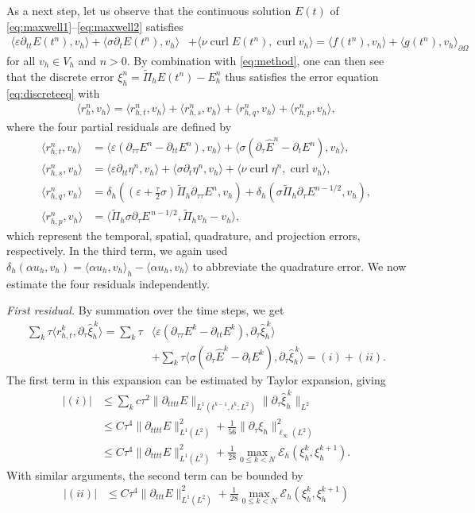 \documentclass[12pt,reqno,a4paper]{amsart}
\theoremstyle{definition}
\def\EE{\mathscr{E}}
\def\dtautau{\partial_{\tau\tau}}
\def\dtau{\partial_{\tau}}
\def\dt{\partial_{t}}
\def\dtt{\partial_{tt}}
\def\dttt{\partial_{ttt}}
\def\dtttt{\partial_{tttt}}
\def\curl{\operatorname{curl}}
\def\wPi{\widetilde\Pi}
\def\E{{E}}
\def\r{{r}}
\def\wt{\widetilde}
\def\wh{\widehat}
\def\eps{\varepsilon}
\def\la{\langle}
\def\ra{\rangle}
\begin{document}
As a next step, let us observe that the continuous solution $E(t)$ of \eqref{eq:maxwell1}--\eqref{eq:maxwell2} satisfies
\begin{align*}
\la\varepsilon \dtt\E(t^n),v_h\ra + \la\sigma\dt\E(t^n), v_h\ra &+ \la\nu\curl\E(t^n),\curl v_h\ra
= \la f(t^n),v_h\ra + \la g(t^n),v_h\ra_{\partial\Omega}
\end{align*}
for all $v_h\in V_h$ and $n>0$.
By combination with \eqref{eq:method}, one can then see that the discrete error $\xi_h^n = \wt\Pi_h E(t^n) - E_h^n$ thus satisfies the error equation \eqref{eq:discreteeq} with 
\begin{align*}
\la\r_h^n,v_h\ra = \la\r_{h,t}^n,v_h\ra + \la \r_{h,s}^n,v_h\ra + \la\r_{h,q}^n,v_h\ra + \la\r_{h,p}^n,v_h\ra,
\end{align*}
where the four partial residuals are defined by 
\begin{align*}
\la\r_{h,t}^n,v_h\ra &= \la\varepsilon(\dtautau E^n -\dtt E^n),v_h\ra + \la\sigma(\dtau \wh E^n-\dt E^n),v_h\ra, \\
\la\r_{h,s}^n,v_h\ra &= \la\varepsilon\dtt\eta^n,v_h\ra + \la\sigma\dt\eta^n,v_h\ra+ \la\nu\curl\eta^n,\curl v_h\ra, \\
\la\r_{h,q}^n,v_h\ra &= \delta_h((\eps+\tfrac\tau2\sigma) \wPi_h \dtautau E^n, v_h) + 
\delta_h(\sigma \wPi_h \dtau E^{n-1/2}, v_h), \\
\la\r_{h,p}^n,v_h\ra &= \la\wPi_h \sigma \dtau E^{\,n-1/2},\wPi_h v_h- v_h\ra,
\end{align*}
which represent the temporal, spatial, quadrature, and projection errors, respectively.
In the third term, we again used $\delta_h(\alpha u_h,v_h) = \la\alpha u_h,v_h\ra_h - \la\alpha u_h,v_h\ra$ to abbreviate the quadrature error.
We now estimate the four residuals independently.

\medskip 
\noindent 
\textit{First residual.}
By summation over the time steps, we get
\begin{align*}
\sum\nolimits_k \tau\la\r_{h,t}^k,\dtau\wh\xi_h^{\,k}\ra
= \sum\nolimits_k  \tau&\la\varepsilon(\dtautau E^k -\dtt E^k),\dtau\wh\xi_h^{\,k}\ra \\
&+ \sum\nolimits_k \tau\la\sigma(\dtau \wh E^k-\dt E^k),\dtau\wh\xi_h^{\,k}\ra
=(i) + (ii).
\end{align*}
The first term in this expansion can be estimated by Taylor expansion, giving
\begin{align*}
|(i)| &\le \sum\nolimits_k c \tau^2 \|\dtttt E\|_{L^1(t^{k-1},t^k;L^2)}\|\dtau \widehat\xi_h^{\,k}\|_{L^2}\\
&\leq C\tau^{4}\|\dtttt E\|_{L^1(L^2)}^2+\tfrac{1}{56}\|\dtau \xi_h\|_{\ell_\infty(L^2)}^2 \\
&\leq C\tau^{4}\|\dtttt E\|_{L^1(L^2)}^2+\tfrac{1}{28}\max_{0\le k<N} \EE_h(\xi_h^k,\xi_h^{k+1}).
\end{align*}
With similar arguments, the second term can be bounded by
\begin{align*}
|(ii)| &\leq C \tau^{4}\|\dttt E\|_{L^1(L^2)}^2+\tfrac{1}{28}\max_{0\le k<N} \EE_h(\xi_h^k,\xi_h^{k+1})
\end{align*}
\end{document}
